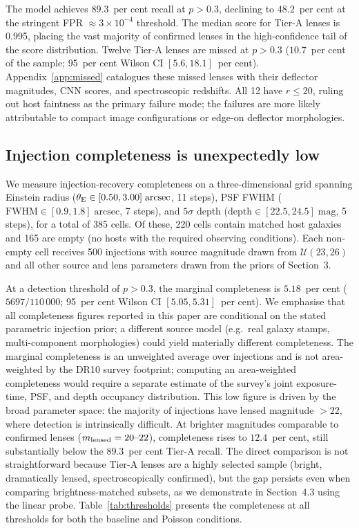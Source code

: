 \documentclass[fleqn,usenatbib]{rasti}
\begin{document}
The model achieves $89.3$~per cent recall at $p > 0.3$, declining to $48.2$~per cent at the stringent FPR $\approx 3 \times 10^{-4}$ threshold.  The median score for Tier-A lenses is 0.995, placing the vast majority of confirmed lenses in the high-confidence tail of the score distribution.  Twelve Tier-A lenses are missed at $p > 0.3$ ($10.7$~per cent of the sample; 95~per cent Wilson CI $[5.6, 18.1]$~per cent).  Appendix~\ref{app:missed} catalogues these missed lenses with their deflector magnitudes, CNN scores, and spectroscopic redshifts.  All 12 have $r \leq 20$, ruling out host faintness as the primary failure mode; the failures are more likely attributable to compact image configurations or edge-on deflector morphologies.

\subsection{Injection completeness is unexpectedly low}

We measure injection-recovery completeness on a three-dimensional grid spanning Einstein radius ($\theta_{\rm E} \in [0.50, 3.00]\;\mathrm{arcsec}$, 11 steps), PSF FWHM ($\mathrm{FWHM} \in [0.9, 1.8]\;\mathrm{arcsec}$, 7 steps), and $5\sigma$ depth ($\mathrm{depth} \in [22.5, 24.5]\;\mathrm{mag}$, 5 steps), for a total of 385 cells.  Of these, 220 cells contain matched host galaxies and 165 are empty (no hosts with the required observing conditions).  Each non-empty cell receives 500 injections with source magnitude drawn from $\mathcal{U}(23, 26)$ and all other source and lens parameters drawn from the priors of Section~3.

At a detection threshold of $p > 0.3$, the marginal completeness is $5.18$~per cent ($5697 / 110\,000$; 95~per cent Wilson CI $[5.05, 5.31]$~per cent).  We emphasise that all completeness figures reported in this paper are conditional on the stated parametric injection prior; a different source model (e.g.\ real galaxy stamps, multi-component morphologies) could yield materially different completeness.  The marginal completeness is an unweighted average over injections and is not area-weighted by the DR10 survey footprint; computing an area-weighted completeness would require a separate estimate of the survey's joint exposure-time, PSF, and depth occupancy distribution.  This low figure is driven by the broad parameter space: the majority of injections have lensed magnitude $> 22$, where detection is intrinsically difficult.  At brighter magnitudes comparable to confirmed lenses ($m_{\rm lensed} = 20\text{--}22$), completeness rises to $12.4$~per cent, still substantially below the $89.3$~per cent Tier-A recall.  The direct comparison is not straightforward because Tier-A lenses are a highly selected sample (bright, dramatically lensed, spectroscopically confirmed), but the gap persists even when comparing brightness-matched subsets, as we demonstrate in Section~4.3 using the linear probe.  Table~\ref{tab:thresholds} presents the completeness at all thresholds for both the baseline and Poisson conditions.
\end{document}
